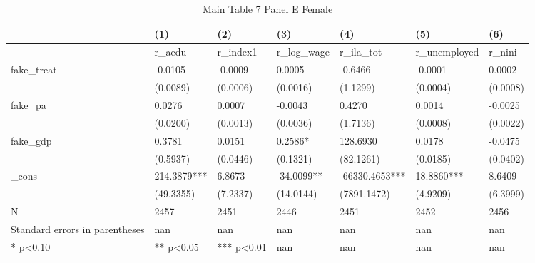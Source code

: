 \documentclass[11pt]{article}
\begin{document}
\clearpage
\begin{table}[!htbp]
\centering
\caption{Main Table 7 Panel E Female}
\label{tab:table7e_f}
\begin{tabular}{lllllll}
\toprule
 & (1) & (2) & (3) & (4) & (5) & (6) \\
\midrule
 & r\_aedu & r\_index1 & r\_log\_wage & r\_ila\_tot & r\_unemployed & r\_nini \\
fake\_treat & -0.0105 & -0.0009 & 0.0005 & -0.6466 & -0.0001 & 0.0002 \\
 & (0.0089) & (0.0006) & (0.0016) & (1.1299) & (0.0004) & (0.0008) \\
fake\_pa & 0.0276 & 0.0007 & -0.0043 & 0.4270 & 0.0014 & -0.0025 \\
 & (0.0200) & (0.0013) & (0.0036) & (1.7136) & (0.0008) & (0.0022) \\
fake\_gdp & 0.3781 & 0.0151 & 0.2586* & 128.6930 & 0.0178 & -0.0475 \\
 & (0.5937) & (0.0446) & (0.1321) & (82.1261) & (0.0185) & (0.0402) \\
\_cons & 214.3879*** & 6.8673 & -34.0099** & -66330.4653*** & 18.8860*** & 8.6409 \\
 & (49.3355) & (7.2337) & (14.0144) & (7891.1472) & (4.9209) & (6.3999) \\
N & 2457 & 2451 & 2446 & 2451 & 2452 & 2456 \\
Standard errors in parentheses & nan & nan & nan & nan & nan & nan \\
* p<0.10 & ** p<0.05 & *** p<0.01 & nan & nan & nan & nan \\
\bottomrule
\end{tabular}

\end{table}
\end{document}
